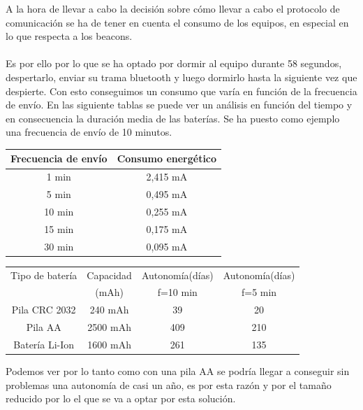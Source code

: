 \documentclass[paper=a4, fontsize=11pt,twoside]{scrartcl}	%
\begin{document}
            A la hora de llevar a cabo la decisión sobre cómo llevar a cabo el protocolo de comunicación se ha de tener en cuenta 
            el consumo de los equipos, en especial en lo que respecta a los beacons.
            \paragraph{}
            Es por ello por lo que se ha optado por dormir al equipo durante 58 segundos, despertarlo,
            enviar su trama bluetooth y luego dormirlo hasta la siguiente vez que despierte.
            Con esto conseguimos un consumo que varía en función de la frecuencia de envío. En las siguiente tablas
            se puede ver un análisis en función del tiempo y en consecuencia la duración media de las baterías.
            Se ha puesto como ejemplo una frecuencia de envío de 10 minutos.
            \begin{center}
                \begin{tabular}{||c || c ||} 
                \hline
                Frecuencia de envío  & Consumo energético  \\ [0.5ex] 
                \hline
                1 min &  2,415 mA \\
                5 min &  0,495 mA \\ 
                10 min &  0,255 mA \\ 
                15 min &  0,175 mA \\ 
                30 min &  0,095 mA \\ 
                \hline
                \end{tabular}
            \end{center}
            \begin{center}
                \begin{tabular}{|c | c| c| c |} 
                \hline
                    Tipo de batería & Capacidad  & Autonomía(días) & Autonomía(días)   \\ [0.5ex] 
                    & (mAh) &  f=10 min &  f=5 min   \\ [0.5ex] 
                \hline
                \hline
                    Pila CRC 2032 &  240 mAh  & 39   & 20 \\ 
                    Pila AA       &  2500 mAh & 409  & 210 \\ 
                    Batería Li-Ion&  1600 mAh & 261  & 135 \\ 
                \hline
                \end{tabular}
            \end{center}
            Podemos ver por lo tanto como con una pila AA se podría llegar a conseguir sin problemas una autonomía de casi un 
            año, es por esta razón y por el tamaño reducido por lo el que se va a optar por esta solución.
            
\end{document}
